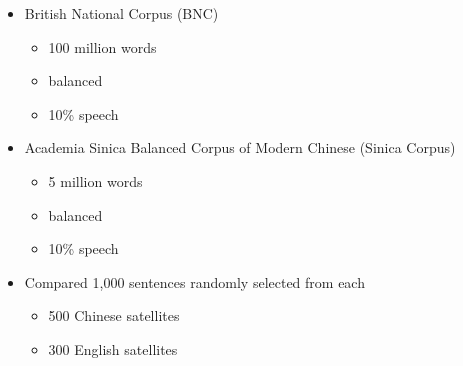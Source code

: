 \documentclass[a4paper,landscape,headrule,footrule,dvips]{foils}
\begin{document}
\begin{CJK}{UTF8}{min}
\MyLogo{}
\begin{itemize}
\item British National Corpus (BNC)
  \begin{itemize}
  \item 100 million words
  \item balanced
  \item 10\% speech
  \end{itemize}
\item Academia Sinica Balanced Corpus of Modern Chinese (Sinica Corpus) 
  \begin{itemize}
  \item 5 million words
  \item balanced
  \item 10\% speech
  \end{itemize}
\item Compared 1,000 sentences randomly selected from each
  \begin{itemize}
  \item 500 Chinese satellites
  \item 300 English satellites
  \end{itemize}
\end{itemize}



\end{CJK}
\end{document}
